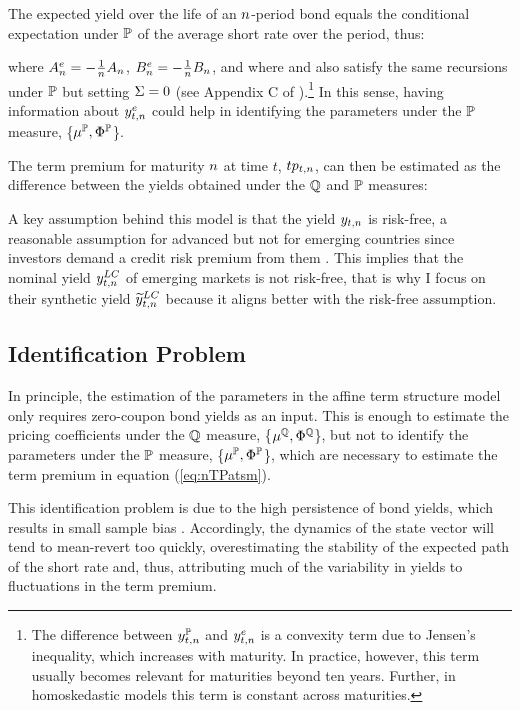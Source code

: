 {The expected yield over the life of an \(n\)-period bond equals the conditional expectation under \(\mathbb{P}\) of the average short rate over the period, thus:

\noindent where \(A_{n}^{e} = - \frac{1}{n} A_{n}\), \(B_{n}^{e} = - \frac{1}{n} B_{n}\), and where  and  also satisfy the same recursions under \(\mathbb{P}\) but setting \(\Sigma = 0\) (see Appendix C of \cite{Guimaraes:2014}).\footnote{ The difference between \(y_{t,n}^{\mathbb{P}}\) and \(y_{t,n}^{e}\) is a convexity term due to Jensen's inequality, which increases with maturity. In practice, however, this term usually becomes relevant for maturities beyond ten years. Further, in homoskedastic models this term is constant across maturities.}
In this sense, having information about \(y_{t,n}^{e}\) could help in identifying the parameters under the \(\mathbb{P}\) measure, \{\(\mu^{\mathbb{P}}, \Phi^{\mathbb{P}}\)\}.

The term premium for maturity $n$ at time $t$, $tp_{t,n}$, can then be estimated as the difference between the yields obtained under the $\mathbb{Q}$ and $\mathbb{P}$ measures:
	
A key assumption behind this model is that the yield $y_{t,n}$ is risk-free, a reasonable assumption for advanced but not for emerging countries since investors demand a credit risk premium from them \citep{DuSchreger:2016JoF}. 
This implies that the nominal yield $y_{t,n} ^{LC}$ of emerging markets is not risk-free, that is why I focus on their synthetic yield $\widetilde{y}_{t,n} ^{LC}$ because it aligns better with the risk-free assumption.

\subsection{Identification Problem} \label{sec:Identification}
\iftoggle{toclinks}{\gototoc}{} %

In principle, the estimation of the parameters in the affine term structure model only  requires zero-coupon bond yields as an input.
This is enough to estimate the pricing coefficients under the $\mathbb{Q}$ measure,
\{\(\mu^{\mathbb{Q}}, \Phi^{\mathbb{Q}}\)\}, but not to identify the parameters under the $\mathbb{P}$ measure, 
\{\(\mu^{\mathbb{P}}, \Phi^{\mathbb{P}}\)\}, which are necessary to estimate the term premium in equation (\ref{eq:nTPatsm}).

This identification problem is due to the high persistence of bond yields, which results in small sample bias \citep{KimOrphanides:2012,Guimaraes:2014}. Accordingly, the dynamics of the state vector will tend to mean-revert too quickly, overestimating the stability of the expected path of the short rate and, thus, attributing much of the variability in yields to fluctuations in the term premium.

}
